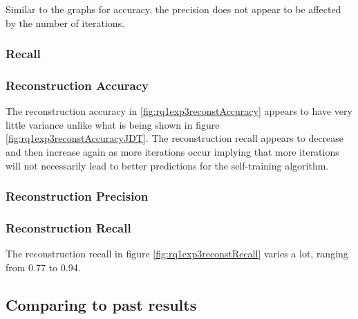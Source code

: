 \documentclass[../main.tex]{subfiles}
\begin{document}

Similar to the graphs for accuracy, the precision does not appear to be affected by the number of iterations. 

\subsubsection{Recall}



\subsubsection{Reconstruction Accuracy}


The reconstruction accuracy in \ref{fig:rq1exp3reconstAccuracy} appears to have very little variance unlike what is being shown in figure \ref{fig:rq1exp3reconstAccuracyJDT}. The reconstruction recall appears to decrease and then increase again as more iterations occur implying that more iterations will not necessarily lead to better predictions for the self-training algorithm. 

\subsubsection{Reconstruction Precision}



\subsubsection{Reconstruction Recall}


The reconstruction recall in figure \ref{fig:rq1exp3reconstRecall} varies a lot, ranging from 0.77 to 0.94. 

\subsection{Comparing to past results}
\end{document}
